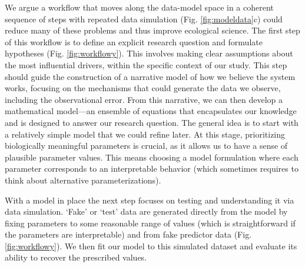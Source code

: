 \documentclass[11pt]{article}
\begin{document}
We argue a workflow that moves along the data-model space in a coherent sequence of steps with repeated data simulation %
(Fig. \ref{fig:modeldata}c) could reduce many of these problems and thus improve ecological science.
The first step of this workflow is to define an explicit research question and formulate hypotheses (Fig. \ref{fig:workflowy}). This involves making clear assumptions about the most influential drivers, within the specific context of our study. This step should guide the construction of a narrative model of how we believe the system works, focusing on the mechanisms that could generate the data we observe, including the observational error. %
From this narrative, we can then develop a mathematical model---an ensemble of equations that encapsulates our knowledge and is designed to answer our research question. The general idea is to start with a relatively simple model that we could refine later. At this stage, prioritizing biologically meaningful parameters is crucial, as it allows us to have a sense of plausible parameter values. This means choosing a model formulation where each parameter corresponds to an interpretable behavior (which sometimes requires to think about alternative parameterizations).

With a model in place the next step focuses on testing and understanding it via data simulation. `Fake' or `test' data are generated directly from the model by fixing parameters to some reasonable range of values (which is straightforward if the parameters are interpretable) and from fake predictor data (Fig. \ref{fig:workflowy}). %
We then fit our model to this simulated dataset and evaluate its ability to recover the prescribed values. 
\end{document}
